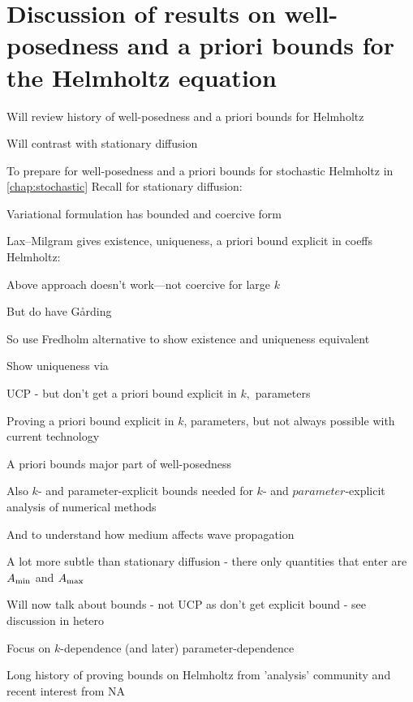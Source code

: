 \section{Discussion of results on well-posedness and a priori bounds for the Helmholtz equation}
\bit
\item Will review history of well-posedness and a priori bounds for Helmholtz
\item Will contrast with stationary diffusion
\item To prepare for well-posedness and a priori bounds for stochastic Helmholtz in \cref{chap:stochastic}
\eit
Recall for stationary diffusion:
\bit
\item Variational formulation has bounded and coercive form
\item Lax--Milgram gives existence, uniqueness, a priori bound explicit in coeffs
\eit
Helmholtz:
\bit
\item Above approach doesn't work---not coercive for large $k$
\item But do have G\r{a}rding
\item So use Fredholm alternative to show existence and uniqueness equivalent
\item Show uniqueness via
\bit
\item UCP - but don't get a priori bound explicit in $k,$ parameters
\item Proving a priori bound explicit in $k$, parameters, but not always possible with current technology
\eit
\item A priori bounds major part of well-posedness
\item Also $k$- and parameter-explicit bounds needed for $k$- and $parameter$-explicit analysis of numerical methods
\item And to understand how medium affects wave propagation
\item A lot more subtle than stationary diffusion - there only quantities that enter are $A_{\min}$ and $A_{\max}$
\eit
\bit
\item Will now talk about bounds - not UCP as don't get explicit bound - see discussion in hetero
\item Focus on $k$-dependence (and later) parameter-dependence
\item Long history of proving bounds on Helmholtz from 'analysis' community \cite{Bl:73,Va:75,BlKa:77,Bu:98,PeVe:99,PoVo:99a,PoVo:99b,CaPoVo:99,Bu:02,Be:03,Ca:12,CaLePa:12,NgVo:12,Sh:17} and recent interest from NA \cite{Me:95,CuFe:02,He:07,EsMe:12,Sp:14,FeLiLo:15,BaSpWu:16,Ch:16,BrGaPe:17,BaChGo:17,SaTo:17,OhVe:18,GrSa:18,GrPeSp:18,GaSpWu:18,MoSp:19}
